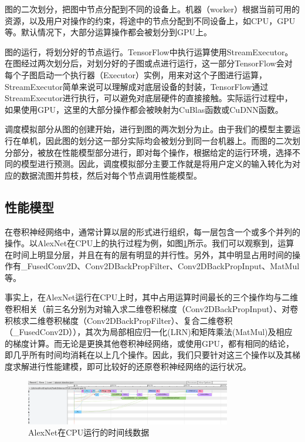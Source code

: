     图的二次划分，把图中节点分配到不同的设备上。机器（worker）根据当前可用的资源，以及用户对操作的约束，将途中的节点分配到不同设备上，如CPU，GPU等。默认情况下，大部分运算操作都会被划分到GPU上。
    
    图的运行，将划分好的节点运行。TensorFlow中执行运算使用StreamExecutor。在图经过两次划分后，对划分好的子图或点进行运行，这一部分TensorFlow会对每个子图启动一个执行器（Executor）实例，用来对这个子图进行运算，StreamExecutor简单来说可以理解成对底层设备的封装，TensorFlow通过StreamExecutor进行执行，可以避免对底层硬件的直接接触。实际运行过程中，如果使用GPU，这里的大部分操作都会被映射为CuBlas函数或CuDNN\cite{cudnn}函数。
    
    调度模拟部分从图的创建开始，进行到图的两次划分为止。由于我们的模型主要运行在单机，因此图的划分这一部分实际均会被划分到同一台机器上。而图的二次划分部分，被放在性能模型部分进行，即对每个操作，根据给定的运行环境，选择不同的模型进行预测。因此，调度模拟部分主要工作就是将用户定义的输入转化为对应的数据流图并剪枝，然后对每个节点调用性能模型。

\subsection{性能模型}
    在卷积神经网络中，通常计算以层的形式进行组织，每一层包含一个或多个并列的操作。以AlexNet在CPU上的执行过程为例，如图\ref{fig:alexnet_timeline}所示。我们可以观察到，运算在时间上明显分层，并且在有的层有明显的并行性。另外，其中明显占用时间的操作有\_FusedConv2D、Conv2DBackPropFilter、Conv2DBackPropInput、MatMul等。
    
    事实上，在AlexNet运行在CPU上时，其中占用运算时间最长的三个操作均与二维卷积相关（前三名分别为对输入求二维卷积梯度（Conv2DBackPropInput）、对卷积核求二维卷积梯度（Conv2DBackPropFilter）、复合二维卷积（\_FusedConv2D）），其次为局部相应归一化(LRN)和矩阵乘法(MatMul)及相应的梯度计算。而无论是更换其他卷积神经网络，或使用GPU，都有相同的结论，即几乎所有时间均消耗在以上几个操作。因此，我们只要针对这三个操作以及其梯度求解进行性能建模，即可比较好的还原卷积神经网络的运行状况。
    
    \begin{figure}[!htbp]
        \centering
        \includegraphics[width=0.8\textwidth]{figures/alexnet_timeline.png}
        \caption{AlexNet在CPU运行的时间线数据}
        \label{fig:alexnet_timeline}
    \end{figure}

